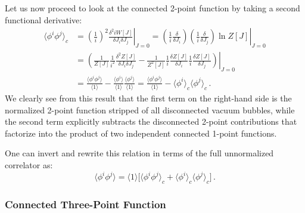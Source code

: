 Let us now proceed to look at the connected 2-point function by taking a second functional derivative:
\begin{equation} \label{eq:connected_two_point}
    \begin{aligned}
        \langle \phi^i \phi^j \rangle_c & = \left. \left(\frac{1}{i}\right)^2 \frac{\delta^2 iW[J]}{\delta J_i \delta J_j} \right|_{J=0} = \left. \left(\frac{1}{i}\frac{\delta}{\delta J_i}\right) \left(\frac{1}{i}\frac{\delta}{\delta J_j}\right) \ln Z[J] \right|_{J=0}                                               \\
                                        & = \left. \left( \frac{1}{Z[J]} \frac{1}{i^2} \frac{\delta^2 Z[J]}{\delta J_i \delta J_j} - \frac{1}{Z^2[J]} \frac{1}{i}\frac{\delta Z[J]}{\delta J_i} \frac{1}{i}\frac{\delta Z[J]}{\delta J_j} \right) \right|_{J=0}                                                            \\
                                        & = \frac{\langle \phi^i \phi^j \rangle}{\langle 1 \rangle} - \frac{\langle \phi^i \rangle}{\langle 1 \rangle} \frac{\langle \phi^j \rangle}{\langle 1 \rangle} = \frac{\langle \phi^i \phi^j \rangle}{\langle 1 \rangle} - \langle \phi^i \rangle_c \langle \phi^j \rangle_c \, .
    \end{aligned}
\end{equation}
We clearly see from this result that the first term on the right-hand side is the normalized 2-point function stripped of all disconnected vacuum bubbles, while the second term explicitly subtracts the disconnected 2-point contributions that factorize into the product of two independent connected 1-point functions.


One can invert and rewrite this relation in terms of the full unnormalized correlator as:
\begin{equation} \label{eq:two_point_decomposition}
    \langle \phi^i \phi^j \rangle = \langle 1 \rangle \big[ \langle \phi^i \phi^j \rangle_c + \langle \phi^i \rangle_c \langle \phi^j \rangle_c \big] \, .
\end{equation}

\subsubsection{Connected Three-Point Function}

